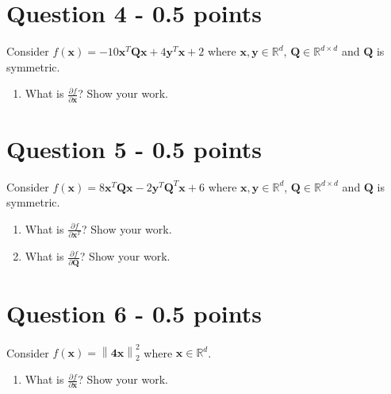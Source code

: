 \documentclass[11pt]{article}
\begin{document}
\section*{Question 4 - 0.5 points}
Consider $f(\mathbf{x}) = -10\mathbf{x}^T\mathbf{Q}\mathbf{x} + 4\mathbf{y}^T\mathbf{x} + 2$ where $\mathbf{x}, \mathbf{y} \in \mathbb{R}^d$, $\mathbf{Q} \in \mathbb{R}^{d\times d}$ and $\mathbf{Q}$ is symmetric.
 \begin{enumerate} 
\item What is $\frac{\partial f}{\partial\mathbf{x}}$?  Show your work. 
\end{enumerate}

\section*{Question 5 - 0.5 points}
Consider $f(\mathbf{x}) = 8\mathbf{x}^T\mathbf{Q}\mathbf{x} - 2\mathbf{y}^T\mathbf{Q}^T\mathbf{x} + 6$ where $\mathbf{x}, \mathbf{y} \in \mathbb{R}^d$, $\mathbf{Q} \in \mathbb{R}^{d\times d}$ and $\mathbf{Q}$ is symmetric.
\begin{enumerate} 
\item What is $\frac{\partial f}{\partial\mathbf{x}^T}$?  Show your work.
\item What is $\frac{\partial f}{\partial\mathbf{Q}}$?  Show your work. 
\end{enumerate}

\section*{Question 6 - 0.5 points}
Consider $f(\mathbf{x}) = \left\|\mathbf{4x}\right\|_{2}^{2}$ where $\mathbf{x} \in \mathbb{R}^d$. \begin{enumerate} 
\item What is $\frac{\partial f}{\partial\mathbf{x}}$?  Show your work. 
\end{enumerate}
\end{document}

